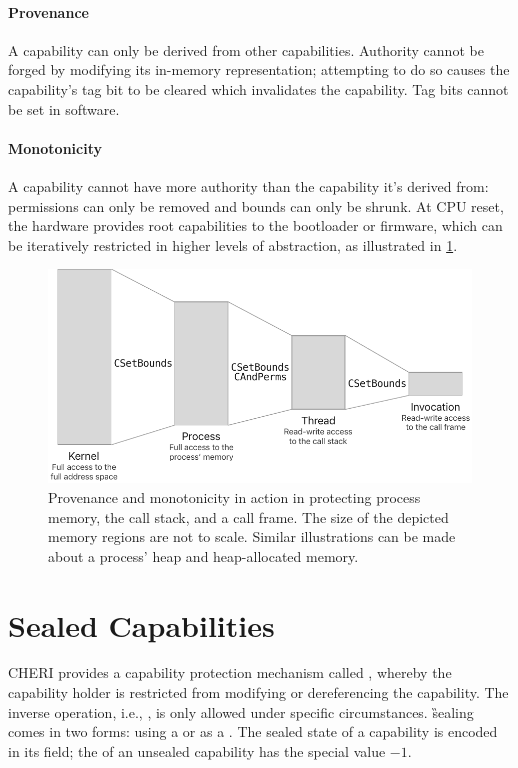 \documentclass[main.tex]{subfiles}
\begin{document}
\paragraph{Provenance} A capability can only be derived from other capabilities. Authority cannot be forged by modifying its in-memory representation; attempting to do so causes the capability's tag bit to be cleared which invalidates the capability. Tag bits cannot be set in software.

\paragraph{Monotonicity} A capability cannot have more authority than the capability it's derived from: permissions can only be removed and bounds can only be shrunk. At CPU reset, the hardware provides root capabilities to the bootloader or firmware, which can be iteratively restricted in higher levels of abstraction, as illustrated in \cref{fig:derivingauth}.

\begin{figure}
	\centering
	\includegraphics{Images/Deriving Authority.pdf}
	\caption{Provenance and monotonicity in action in protecting process memory, the call stack, and a call frame. The size of the depicted memory regions are not to scale. Similar illustrations can be made about a process' heap and heap-allocated memory.}
	\label{fig:derivingauth}
\end{figure}

\section{Sealed Capabilities}
CHERI provides a capability protection mechanism called \textbf{}, whereby the capability holder is restricted from modifying or dereferencing the capability. The inverse operation, i.e., \textbf{}, is only allowed under specific circumstances. \G{sealing} comes in two forms:  using a  or  as a . The sealed state of a capability is encoded in its \textbf{} field; the  of an unsealed capability has the special value $-1$.
\end{document}
